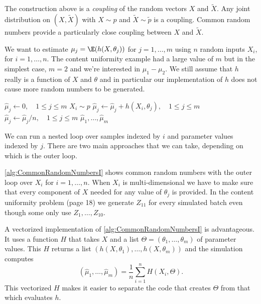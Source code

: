 The construction above is a \textit{coupling} of the random vectors $X$ and $\widetilde{X}$. Any joint distribution on $(X, \widetilde{X})$ with $X \sim p$ and $\widetilde{X} \sim \tilde{p}$ is a coupling. Common random numbers provide a particularly close coupling between $X$ and $\widetilde{X}$.

We want to estimate $\mu_j = \E(h(X, \theta_j))$ for $j = 1, \dots, m$ using $n$ random inputs $X_i$, for $i = 1, \dots, n$. The content uniformity example had a large value of $m$ but in the simplest case, $m=2$ and we're interested in $\mu_1 - \mu_2$. We still assume that $h$ really is a function of $X$ and $\theta$ and in particular our implementation of $h$ does not cause more random numbers to be generated.

\begin{algorithm}[H]
	\caption{Common Random Numbers Algorithm I}
	\label{alg:CommonRandomNumbersI}
	\begin{algorithmic}[1]
		\State {}
		\State $\hat{\mu}_j \gets 0, \quad 1 \le j \le m$
		\State $X_i \sim p$
		\State $\hat{\mu}_j \gets \hat{\mu}_j + h(X_i, \theta_j), \quad 1 \le j \le m$
		\EndFor
		\State $\hat{\mu}_j \gets \hat{\mu}_j / n, \quad 1 \le j \le m$
		\State \Return $\hat{\mu}_1, \dots, \hat{\mu}_m$
	\end{algorithmic}
\end{algorithm}

We can run a nested loop over samples indexed by $i$ and parameter values indexed by $j$. There are two main approaches that we can take, depending on which is the outer loop.

\cref{alg:CommonRandomNumbersI} shows common random numbers with the outer loop over $X_i$ for $i = 1, \dots, n$. When $X_i$ is multi-dimensional we have to make sure that every component of $X$ needed for any value of $\theta_j$ is provided. In the content uniformity problem (page 18) we generate $Z_{11}$ for every simulated batch even though some only use $Z_1, \dots, Z_{10}$.

A vectorized implementation of \cref{alg:CommonRandomNumbersI} is advantageous. It uses a function $H$ that takes $X$ and a list $\Theta = (\theta_1, \dots, \theta_m)$ of parameter values. This $H$ returns a list $(h(X, \theta_1), \dots, h(X, \theta_m))$ and the simulation computes
\begin{equation}
	(\hat{\mu}_1, \dots, \hat{\mu}_m) = \frac{1}{n} \sum_{i=1}^n H(X_i, \Theta).
	\label{eq:VectorizedCommonRandomNumbers}
\end{equation}
This vectorized $H$ makes it easier to separate the code that creates $\Theta$ from that which evaluates $h$.

